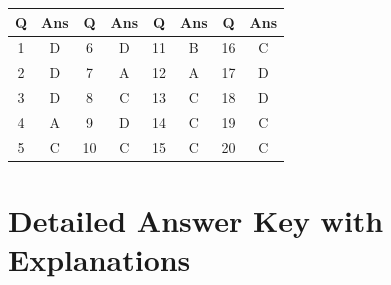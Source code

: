 \documentclass[11pt]{article}
\begin{document}
\begin{center}
\begin{tabular}{|c|c||c|c||c|c||c|c|}
\hline
\textbf{Q} & \textbf{Ans} & \textbf{Q} & \textbf{Ans} & \textbf{Q} & \textbf{Ans} & \textbf{Q} & \textbf{Ans} \\
\hline
1 & D & 6 & D & 11 & B & 16 & C \\
2 & D & 7 & A & 12 & A & 17 & D \\
3 & D & 8 & C & 13 & C & 18 & D \\
4 & A & 9 & D & 14 & C & 19 & C \\
5 & C & 10 & C & 15 & C & 20 & C \\
\hline
\end{tabular}
\end{center}

\vspace{1cm}

\section*{Detailed Answer Key with Explanations}
\end{document}
